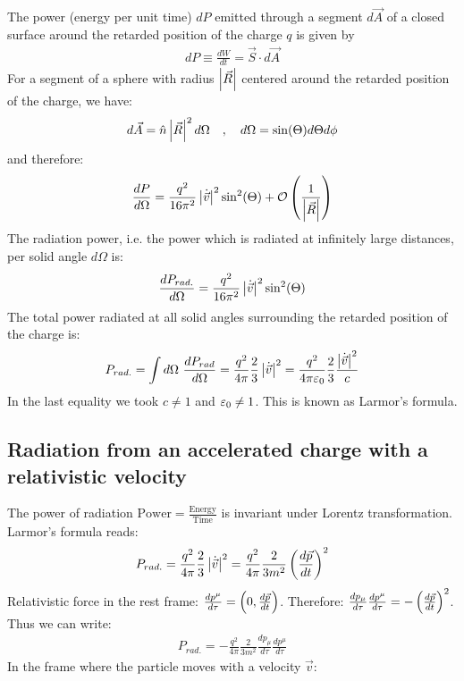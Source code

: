 The power (energy per unit time) $dP$ emitted through a segment $d \vec{A}$
of a closed surface around the retarded position of the charge $q$ is given
by
\begin{align*}
    dP \equiv \frac{dW}{dt} = \vec{S} \cdot d \vec{A}
\end{align*}
For a segment of a sphere with radius $\left\vert \vec{R} \right\vert$ centered around the
retarded position of the charge, we have:
\begin{align*}
    d \vec{A} = \hat{n} \left\vert \vec{R} \right\vert^2 d \Omega
    \hspace{10pt} , \hspace{10pt}
    d \Omega = \sin(\Theta) d \Theta d \phi
\end{align*}
and therefore:
\begin{align*}
    \frac{dP}{d \Omega} = \frac{q^2}{16 \pi^2} \left\vert \dot{\vec{v}} \right\vert^2 \sin^2 (\Theta)
    + \mathcal{O} \left( \frac{1}{\left\vert \vec{R} \right\vert} \right)
\end{align*}
The radiation power, i.e. the power which is radiated at infinitely large distances,
per solid angle $d \Omega$ is:
\begin{align*}
    \frac{d P_{rad.}}{d \Omega} = \frac{q^2}{16 \pi^2} \left\vert \dot{\vec{v}} \right\vert^2 \sin^2(\Theta)
\end{align*}
The total power radiated at all solid angles surrounding the retarded position
of the charge is:
\begin{align*}
    P_{rad.} = \int d \Omega \ \frac{dP_{rad}}{d \Omega}
    = \frac{q^2}{4 \pi} \frac{2}{3} \left\vert \dot{\vec{v}} \right\vert^2
    = \frac{q^2}{4 \pi \varepsilon_0} \frac{2}{3} \frac{\left\vert \dot{\vec{v}} \right\vert^2}{c}
\end{align*}
In the last equality we took $c \neq 1$ and $\varepsilon_0 \neq 1$.
This is known as Larmor's formula.

\subsection{Radiation from an accelerated charge with a relativistic velocity}

The power of radiation $\text{Power} = \frac{\text{Energy}}{\text{Time}}$
is invariant under Lorentz transformation. Larmor's formula reads:
\begin{align*}
    P_{rad.} = \frac{q^2}{4 \pi} \frac{2}{3} \left\vert \dot{\vec{v}} \right\vert^2
    = \frac{q^2}{4 \pi} \frac{2}{3 m^2} \left( \frac{d \vec{p}}{dt} \right)^2
\end{align*}
Relativistic force in the rest frame: $\frac{d p^\mu}{d \tau} = \left( 0,\frac{d \vec{p}}{d t} \right)$.
Therefore: $\frac{dp_\mu}{d \tau} \frac{d p^\mu}{d \tau} = - \left( \frac{d \vec{p}}{d t} \right)^2$.
Thus we can write:
\begin{align*}
    P_{rad.} = - \frac{q^2}{4 \pi} \frac{2}{3 m^2} \frac{d p_\mu}{d \tau}
        \frac{d p^\mu}{d \tau}
\end{align*}
In the frame where the particle moves with a velocity $\vec{v}$:

